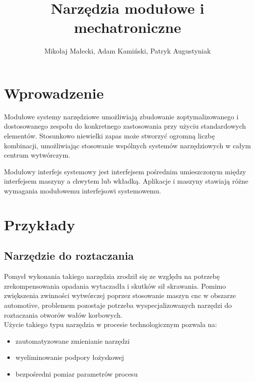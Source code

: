 \documentclass[13pt]{article}
\date{\displaydate{date}}
\title{Narzędzia modułowe i mechatroniczne}
\author{Mikołaj Małecki, Adam Kamiński, Patryk Augustyniak}
\begin{document}
	\maketitle


\section{Wprowadzenie}
Modułowe systemy narzędziowe umożliwiają zbudowanie zoptymalizowanego i dostosowanego zespołu do konkretnego zastosowania przy użyciu standardowych elementów. Stosunkowo niewielki zapas może stworzyć ogromną liczbę kombinacji, umożliwiając stosowanie wspólnych systemów narzędziowych w całym centrum wytwórczym.

Modułowy interfejs systemowy jest interfejsem pośrednim umieszczonym między interfejsem maszyny a chwytem lub wkładką. Aplikacje i maszyny stawiają różne wymagania modułowemu interfejsowi systemowemu.

\newpage





\newpage
\section{Przykłady}
\subsection{Narzędzie do roztaczania}

Pomysł wykonania takiego narzędzia zrodził się ze względu na potrzebę zrekompensowania opadania wytaczadła i skutków sił skrawania. Pomimo zwiększenia zwinności wytwórczej poprzez stosowanie maszyn cnc w obszarze automotive, problemem pozostaje potrzeba wyspecjalizowanych narzędzi do roztaczania otworów wałów korbowych.\\


Użycie takiego typu narzędzia w procesie technologicznym pozwala na:
\begin{itemize}
\item zautomatyzowane zmienianie narzędzi
\item wyeliminowanie podpory łożyskowej
\item bezpośredni pomiar parametrów procesu
\end{itemize}
\end{document}
